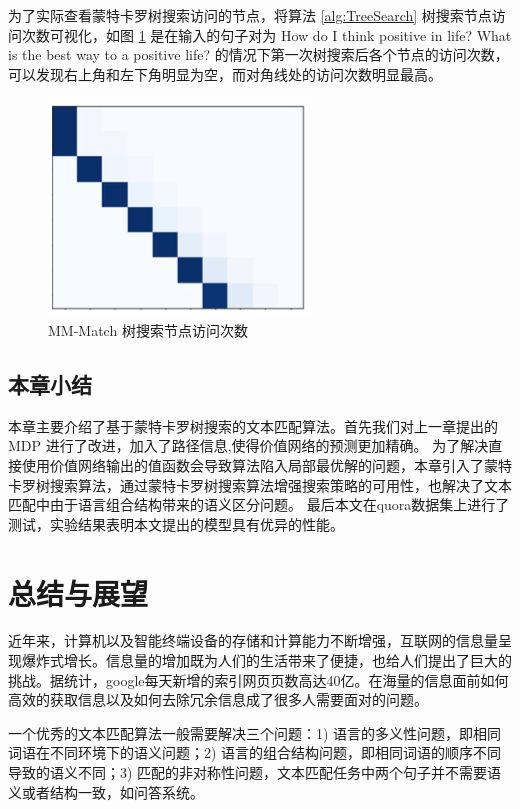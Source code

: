 为了实际查看蒙特卡罗树搜索访问的节点，将算法 \ref{alg:TreeSearch} 树搜索节点访问次数可视化，如图 \ref{fig:MCTS_exp_path} 是在输入的句子对为 How do I think positive in life? What is the best way to a positive life? 的情况下第一次树搜索后各个节点的访问次数，可以发现右上角和左下角明显为空，而对角线处的访问次数明显最高。

\begin{figure}[!htbp]
\vspace{1em}
\centering
  \includegraphics[width=0.4\linewidth]{figures/MCTS_exp_path}
  \caption{MM-Match 树搜索节点访问次数}
  \label{fig:MCTS_exp_path}       %
\vspace{1em}
\end{figure}



\section{本章小结}
本章主要介绍了基于蒙特卡罗树搜索的文本匹配算法。首先我们对上一章提出的 MDP 进行了改进，加入了路径信息,使得价值网络的预测更加精确。
为了解决直接使用价值网络输出的值函数会导致算法陷入局部最优解的问题，本章引入了蒙特卡罗树搜索算法，通过蒙特卡罗树搜索算法增强搜索策略的可用性，也解决了文本匹配中由于语言组合结构带来的语义区分问题。
最后本文在quora数据集上进行了测试，实验结果表明本文提出的模型具有优异的性能。

\chapter{总结与展望}
近年来，计算机以及智能终端设备的存储和计算能力不断增强，互联网的信息量呈现爆炸式增长。信息量的增加既为人们的生活带来了便捷，也给人们提出了巨大的挑战。据统计，google每天新增的索引网页页数高达40亿。在海量的信息面前如何高效的获取信息以及如何去除冗余信息成了很多人需要面对的问题。


一个优秀的文本匹配算法一般需要解决三个问题：1) 语言的多义性问题，即相同词语在不同环境下的语义问题；2) 语言的组合结构问题，即相同词语的顺序不同导致的语义不同；3) 匹配的非对称性问题，文本匹配任务中两个句子并不需要语义或者结构一致，如问答系统。


